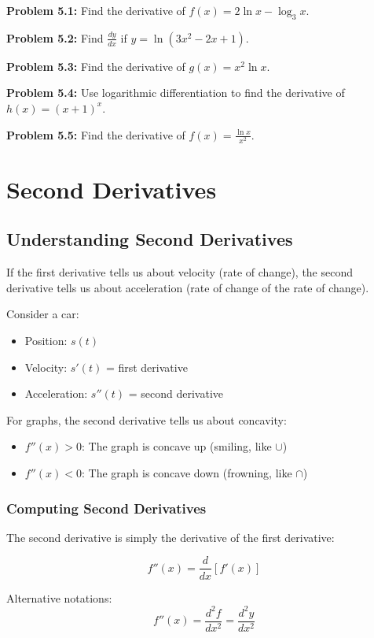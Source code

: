 \documentclass[12pt,a4paper]{book}
\theoremstyle{definition}
\begin{document}
\textbf{Problem 5.1:} Find the derivative of $f(x) = 2\ln x - \log_3 x$.

\textbf{Problem 5.2:} Find $\frac{dy}{dx}$ if $y = \ln(3x^2 - 2x + 1)$.

\textbf{Problem 5.3:} Find the derivative of $g(x) = x^2 \ln x$.

\textbf{Problem 5.4:} Use logarithmic differentiation to find the derivative of $h(x) = (x + 1)^x$.

\textbf{Problem 5.5:} Find the derivative of $f(x) = \frac{\ln x}{x^2}$.

\chapter{Second Derivatives}

\section{Understanding Second Derivatives}

\begin{intuition}
If the first derivative tells us about velocity (rate of change), the second derivative tells us about acceleration (rate of change of the rate of change).

Consider a car:
\begin{itemize}
    \item Position: $s(t)$
    \item Velocity: $s'(t)$ = first derivative
    \item Acceleration: $s''(t)$ = second derivative
\end{itemize}

For graphs, the second derivative tells us about concavity:
\begin{itemize}
    \item $f''(x) > 0$: The graph is concave up (smiling, like $\cup$)
    \item $f''(x) < 0$: The graph is concave down (frowning, like $\cap$)
\end{itemize}
\end{intuition}

\subsection{Computing Second Derivatives}

\begin{keyformula}
The second derivative is simply the derivative of the first derivative:

$$f''(x) = \frac{d}{dx}[f'(x)]$$

Alternative notations:
$$f''(x) = \frac{d^2f}{dx^2} = \frac{d^2y}{dx^2}$$
\end{keyformula}
\end{document}
